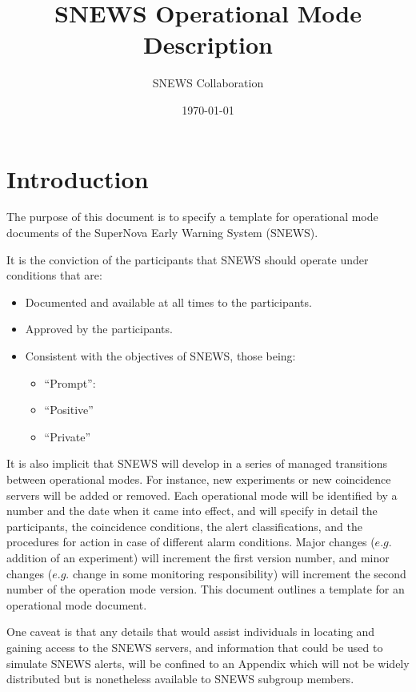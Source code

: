 \documentclass{article}
\begin{document}
\title{SNEWS Operational Mode Description}         
\author{SNEWS Collaboration}
\date{\today}
\maketitle

\section{Introduction}      
The purpose of this document is to specify a template for operational
mode documents of the SuperNova Early Warning System (SNEWS).

It is the conviction of the participants that SNEWS should operate
under conditions that are:

\begin{itemize}
\item Documented and available at all times to the participants.
\item Approved by the participants.
\item Consistent with the objectives of SNEWS, those being:
\begin{itemize}
\item ``Prompt'':
\item ``Positive''
\item ``Private''
\end{itemize}
\end{itemize}

It is also implicit that SNEWS will develop in a series of managed
transitions between operational modes. For instance, new experiments
or new coincidence servers will be added or removed.  Each operational
mode will be identified by a number and the date when it came into
effect, and will specify in detail the participants, the coincidence
conditions, the alert classifications, and the procedures for action
in case of different alarm conditions.  Major changes ($e.g.$ addition
of an experiment) will increment the first version number, and minor changes
($e.g.$ change in some monitoring responsibility) will increment the
second number of the operation mode version.  This document outlines a
template for an operational mode document.

One caveat is that any details that would assist individuals in locating
and gaining access to the SNEWS servers, and information that could be
used to simulate SNEWS alerts, will be confined to an Appendix which
will not be widely distributed but is nonetheless available to SNEWS
subgroup members.
\end{document}
